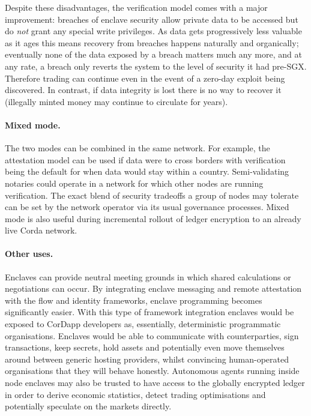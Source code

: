 \documentclass{article}
\begin{document}
Despite these disadvantages, the verification model comes with a major improvement: breaches of enclave security
allow private data to be accessed but do \emph{not} grant any special write privileges. As data gets progressively
less valuable as it ages this means recovery from breaches happens naturally and organically; eventually none of
the data exposed by a breach matters much any more, and at any rate, a breach only reverts the system to the level
of security it had pre-SGX. Therefore trading can continue even in the event of a zero-day exploit being
discovered. In contrast, if data integrity is lost there is no way to recover it (illegally minted money may
continue to circulate for years).

\paragraph{Mixed mode.}The two modes can be combined in the same network. For example, the attestation model can be used
if data were to cross borders with verification being the default for when data would stay within a country.
Semi-validating notaries could operate in a network for which other nodes are running verification. The
exact blend of security tradeoffs a group of nodes may tolerate can be set by the network operator via its usual
governance processes. Mixed mode is also useful during incremental rollout of ledger encryption to an already live
Corda network.

\paragraph{Other uses.}Enclaves can provide neutral meeting grounds in which shared calculations or negotiations
can occur. By integrating enclave messaging and remote attestation with the flow and identity frameworks, enclave
programming becomes significantly easier. With this type of framework integration enclaves would be exposed to
CorDapp developers as, essentially, deterministic programmatic organisations. Enclaves would be able to communicate
with counterparties, sign transactions, keep secrets, hold assets and potentially even move themselves around
between generic hosting providers, whilst convincing human-operated organisations that they will behave honestly.
Autonomous agents running inside node enclaves may also be trusted to have access to the globally encrypted ledger
in order to derive economic statistics, detect trading optimisations and potentially speculate on the markets
directly.
\end{document}
